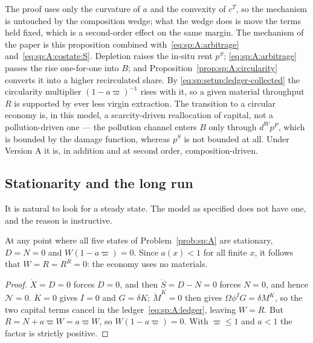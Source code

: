 The proof uses only the curvature of $a$ and the convexity of $c^T$, so the mechanism is untouched by
the composition wedge; what the wedge does is move the terms held fixed, which is a second-order
effect on the same margin. The mechanism of the paper is this proposition combined
with~\eqref{eq:sp:A:arbitrage} and~\eqref{eq:sp:A:costate:S}. Depletion raises the in-situ rent $p^S$;
\eqref{eq:sp:A:arbitrage} passes the rise one-for-one into $B$; and
Proposition~\ref{prop:sp:A:circularity} converts it into a higher recirculated share. By
\eqref{eq:sp:setup:ledger-collected} the circularity multiplier $\left(1-a\varpi\right)^{-1}$ rises
with it, so a given material throughput $R$ is supported by ever less virgin extraction. The
transition to a circular economy is, in this model, a scarcity-driven reallocation of capital, not a
pollution-driven one --- the pollution channel enters $B$ only through $d^Wp^P$, which is
bounded by the damage function, whereas $p^S$ is not bounded at all. Under Version A it is, in
addition and at second order, composition-driven.


\subsection{Stationarity and the long run}\label{sec:sp:A:longrun}

It is natural to look for a steady state. The model as specified does not have one, and the reason is
instructive.

\begin{proposition}\label{prop:sp:A:nosteadystate}
At any point where all five states of Problem~\ref{prob:sp:A} are stationary, $D=N=0$ and
$W\left(1-a\varpi\right)=0$. Since $a(x)<1$ for all finite $x$, it follows that $W=R=R^R=0$: the
economy uses no materials.
\end{proposition}

\begin{proof}
$\dot X=D=0$ forces $D=0$, and then $\dot S=D-N=0$ forces $N=0$, and hence $\mathcal N=0$. $\dot K=0$
gives $I=0$ and $G=\delta K$; $\dot M^K=0$ then gives $\Omega\phi^IG=\delta M^K$, so the two capital
terms cancel in the ledger~\eqref{eq:sp:A:ledger}, leaving $W=R$. But $R=N+a\varpi W=a\varpi W$, so
$W\left(1-a\varpi\right)=0$. With $\varpi\le1$ and $a<1$ the factor is strictly positive.
\end{proof}

